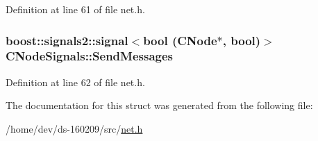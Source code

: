 Definition at line 61 of file net.\+h.

\hypertarget{struct_c_node_signals_a72f761e2001b2cd5355b20e1168bf903}{}
\subsubsection[{Send\+Messages}]{\setlength{\rightskip}{0pt plus 5cm}boost\+::signals2\+::signal$<$bool ({\bf C\+Node}$\ast$, bool)$>$ C\+Node\+Signals\+::\+Send\+Messages}\label{struct_c_node_signals_a72f761e2001b2cd5355b20e1168bf903}


Definition at line 62 of file net.\+h.



The documentation for this struct was generated from the following file\+:\begin{DoxyCompactItemize}
\item 
/home/dev/ds-\/160209/src/\hyperlink{net_8h}{net.\+h}\end{DoxyCompactItemize}
